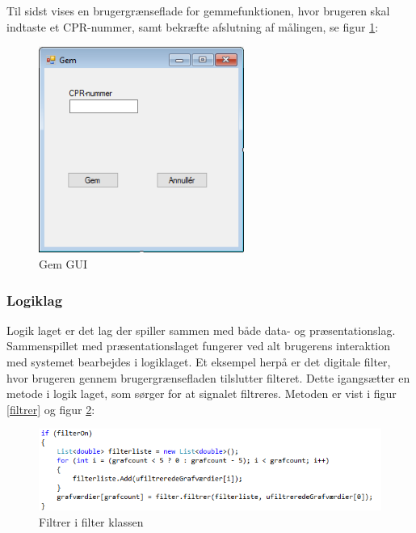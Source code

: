 
Til sidst vises en brugergrænseflade for gemmefunktionen, hvor brugeren skal indtaste et CPR-nummer, samt bekræfte afslutning af målingen, se figur \ref{Gem}:

\begin{figure}[H]
	\centering
	\includegraphics[width=0.6\textwidth]{Figurer/SoftwareImplementering/Gem}
	\caption{Gem GUI}
	\label{Gem}
\end{figure}

\subsubsection{Logiklag}\label{Logiklag}
Logik laget er det lag der spiller sammen med både data- og præsentationslag. Sammenspillet med præsentationslaget fungerer ved alt brugerens interaktion med systemet bearbejdes i logiklaget. Et eksempel herpå er det digitale filter, hvor brugeren gennem brugergrænsefladen tilslutter filteret. Dette igangsætter en metode i logik laget, som sørger for at signalet filtreres. Metoden er vist i figur \ref{filtrer} og figur \ref{Filtrer}:

\begin{figure}[H]
	\centering
	\includegraphics[width=1.15\textwidth]{Figurer/SoftwareImplementering/Filtrer1}
	\caption{Filtrer i filter klassen}
	\label{Filtrer}
\end{figure}

